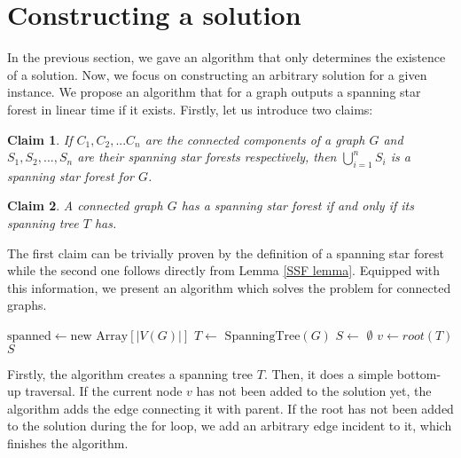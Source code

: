 \documentclass[en]{pracamgr}
\newtheorem{claim}{Claim}
\theoremstyle{definition}
\newcommand{\ssf}{spanning star forest}
\begin{document}
\section{Constructing a solution}

In the previous section, we gave an algorithm that only determines the existence of a solution. Now, we focus on constructing an arbitrary solution for a given instance. We propose an algorithm that for a graph outputs a spanning star forest in linear time if it exists. Firstly, let us introduce two claims:

\begin{claim} \label{SSF sum}
	If $C_1,C_2,...C_n$ are the connected components of a graph $G$ and $S_1,S_2,...,S_n$ are their \ssf{}s respectively, then $\bigcup\limits_{i=1}^n S_i$ is a \ssf{} for $G$.
\end{claim}

\begin{claim} \label{Spanning tree SSF}
	A connected graph $G$ has a \ssf{} if and only if its spanning tree $T$ has.
\end{claim}

The first claim can be trivially proven by the definition of a \ssf{} while the second one follows directly from Lemma \ref{SSF lemma}. Equipped with this information, we present an algorithm which solves the problem for connected graphs.

\begin{algorithm}\label{alg1}
	\KwOut{\ssf{} of $G$}
	$\textrm{spanned} \leftarrow \textrm{new Array}[|V(G)|]$\;
	$T \leftarrow$ $\textrm{SpanningTree}(G)$\;
	$S \leftarrow$ $\emptyset$\;
	$v \leftarrow root(T)$\;
	\Return $S$\;
	\caption{Obtaining a spanning star forest from a connected graph.}
\end{algorithm}

Firstly, the algorithm creates a spanning tree $T$. Then, it does a simple bottom-up traversal. If the current node $v$ has not been added to the solution yet, the algorithm adds the edge connecting it with parent. If the root has not been added to the solution during the for loop, we add an arbitrary edge incident to it, which finishes the algorithm.
\end{document}
